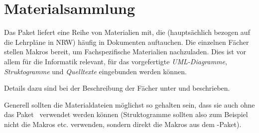 \section{Materialsammlung}\label{sec:materialsammlung}
Das Paket liefert eine Reihe von Materialien mit, die (hauptsächlich bezogen auf die Lehrpläne in NRW) häufig in Dokumenten auftauchen. Die einzelnen Fächer stellen Makros bereit, um Fachspezifische Materialien nachzuladen. Dies ist vor allem für die Informatik relevant, für das vorgefertigte \emph{UML-Diagramme}, \emph{Struktogramme} und \emph{Quelltexte} eingebunden werden können.

Details dazu sind bei der Beschreibung der Fächer unter  und  beschrieben.

Generell sollten die Materialdateien möglichst so gehalten sein, dass sie auch ohne das Paket \ngbschule\ verwendet werden können (Struktogramme sollten also zum Beispiel nicht die Makros  etc. verwenden, sondern direkt die Makros aus dem -Paket).